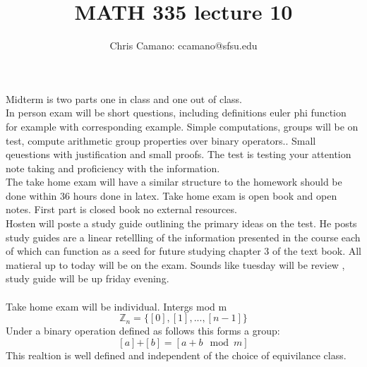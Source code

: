\documentclass[11pt]{article}
\author{Chris Camano: ccamano@sfsu.edu}
\title{MATH 335  lecture 10 }
\date
\theoremstyle{definition}  %
\newcommand{\Z}{\mathbb{Z}}
\begin{document}
\maketitle

Midterm is two parts one in class and one out of class. \\
In person exam will be short questions, including definitions euler phi function for example with corresponding example. Simple computations, groups will be on test, compute  arithmetic group properties over binary operators.. Small qeuestions with justification and small proofs. The test is testing your attention note taking and proficiency with the information. \\
The take home exam will have a similar structure to the homework should be done within 36 hours done in latex. Take home exam is open book and open notes. First part is closed book no external resources. \\
Hosten will poste a study guide outlining the primary ideas on the test. He posts study guides are a linear retellling of the information presented in the course each of which can function as a seed for future studying chapter 3 of the text book. All matieral up to today will be on the exam. Sounds like tuesday will be review , study guide will be up friday evening.\\\\
Take home exam will be individual.
 Intergs mod m\\
$$\Z_n=\{[0],[1],...,[n-1]\}$$
Under a binary operation defined as follows this forms a group:
\[
  [a] \textbf{+} [b]=[a+b \mod m ]
\]
This realtion is well defined and independent of the choice of equivilance class.
\end{document}

